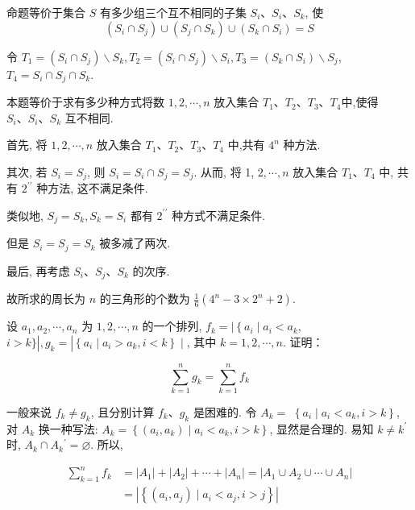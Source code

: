 \begin{analysis}
	命题等价于集合 $S$ 有多少组三个互不相同的子集 $S_{i} 、 S_{i} 、 S_{k}$, 使
	$$
		\left(S_{i} \cap S_{j}\right) \cup\left(S_{j} \cap S_{k}\right) \cup\left(S_{k} \cap S_{i}\right)=S
	$$
\end{analysis}

\begin{solution}
令 $T_{1}=\left(S_{i} \cap S_{j}\right) \backslash S_{k}, T_{2}=\left(S_{i} \cap S_{j}\right) \backslash S_{i}, T_{3}=\left(S_{k} \cap S_{i}\right) \backslash S_{j}$, $T_{4}=S_{i} \cap S_{j} \cap S_{k}$.

本题等价于求有多少种方式将数 $1,2, \cdots, n$ 放入集合 $T_{1} 、 T_{2} 、 T_{3} 、 T_{4}$中,使得 $S_{i} 、 S_{i} 、 S_{k}$ 互不相同.

首先, 将 $1,2, \cdots, n$ 放入集合 $T_{1} 、 T_{2} 、 T_{3} 、 T_{4}$ 中,共有 $4^{n}$ 种方法.

其次, 若 $S_{i}=S_{j}$, 则 $S_{i}=S_{i} \cap S_{j}=S_{j}$. 从而, 将 1, $2, \cdots, n$ 放入集合 $T_{1} 、 T_{4}$ 中, 共有 $2^{\prime \prime}$ 种方法, 这不满足条件.

类似地, $S_{j}=S_{k}, S_{k}=S_{i}$ 都有 $2^{\prime \prime}$ 种方式不满足条件.

但是 $S_{i}=S_{j}=S_{k}$ 被多减了两次.

最后, 再考虑 $S_{i} 、 S_{j} 、 S_{k}$ 的次序.

故所求的周长为 $n$ 的三角形的个数为 $\frac{1}{6}\left(4^{n}-3 \times 2^{n}+2\right)$.
\end{solution}

\begin{example}
	设 $a_{1}, a_{2}, \cdots, a_{n}$ 为 $1,2, \cdots, n$ 的一个排列, $f_{k}=\mid\left\{a_{i} \mid a_{i}<a_{k}\right.$, $i>k\}\left|, g_{k}=\right|\left\{a_{i} \mid a_{i}>a_{k}, i<k\right\} \mid$, 其中 $k=1,2, \cdots, n$. 证明：

	$$
		\sum_{k=1}^{n} g_{k}=\sum_{k=1}^{n} f_{k}
	$$
\end{example}

\begin{analysis}
	一般来说 $f_{k} \neq g_{k}$, 且分别计算 $f_{k} 、 g_{k}$ 是困难的. 令 $A_{k}=$ $\left\{a_{i} \mid a_{i}<a_{k}, i>k\right\}$, 对 $A_{k}$ 换一种写法: $A_{k}=\left\{\left(a_{i}, a_{k}\right) \mid a_{i}<a_{k}, i>k\right\}$, 显然是合理的. 易知 $k \neq k^{\prime}$ 时, $A_{k} \cap A_{k}{ }^{\prime}=\varnothing$. 所以,

	$$
		\begin{aligned}
			\sum_{k=1}^{n} f_{k} & =\left|A_{1}\right|+\left|A_{2}\right|+\cdots+\left|A_{n}\right|=\left|A_{1} \cup A_{2} \cup \cdots \cup A_{n}\right| \\
			                     & =\left|\left\{\left(a_{i}, a_{j}\right) \mid a_{i}<a_{j}, i>j\right\}\right|
		\end{aligned}
	$$
\end{analysis}

